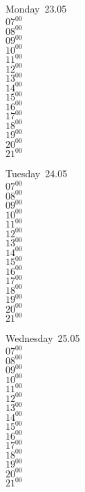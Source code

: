 \documentclass[11pt,a4paper]{book}\usepackage[]{graphicx}\usepackage[]{color}
\begin{document}
\begin{headerbox}
\end{headerbox}
\begin{weekdaybox}
  Monday~23.05\\
  { 
  \vfill
  $07^{00}$\\
$08^{00}$\\
$09^{00}$\\
$10^{00}$\\
$11^{00}$\\
$12^{00}$\\
$13^{00}$\\
$14^{00}$\\
$15^{00}$\\
$16^{00}$\\
$17^{00}$\\
$18^{00}$\\
$19^{00}$\\
$20^{00}$\\
$21^{00}$\\
  }
\end{weekdaybox}
\begin{weekdaybox}
  Tuesday~24.05\\
  { 
  \vfill
  $07^{00}$\\
$08^{00}$\\
$09^{00}$\\
$10^{00}$\\
$11^{00}$\\
$12^{00}$\\
$13^{00}$\\
$14^{00}$\\
$15^{00}$\\
$16^{00}$\\
$17^{00}$\\
$18^{00}$\\
$19^{00}$\\
$20^{00}$\\
$21^{00}$\\
  }
\end{weekdaybox}
\begin{weekdaybox}
  Wednesday~25.05\\
  { 
  \vfill
  $07^{00}$\\
$08^{00}$\\
$09^{00}$\\
$10^{00}$\\
$11^{00}$\\
$12^{00}$\\
$13^{00}$\\
$14^{00}$\\
$15^{00}$\\
$16^{00}$\\
$17^{00}$\\
$18^{00}$\\
$19^{00}$\\
$20^{00}$\\
$21^{00}$\\
  }
\end{weekdaybox}
\end{document}
